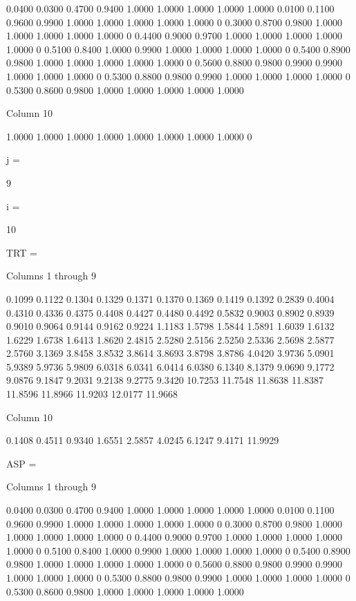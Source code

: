     0.0400    0.0300    0.4700    0.9400    1.0000    1.0000    1.0000    1.0000    1.0000
    0.0100    0.1100    0.9600    0.9900    1.0000    1.0000    1.0000    1.0000    1.0000
         0    0.3000    0.8700    0.9800    1.0000    1.0000    1.0000    1.0000    1.0000
         0    0.4400    0.9000    0.9700    1.0000    1.0000    1.0000    1.0000    1.0000
         0    0.5100    0.8400    1.0000    0.9900    1.0000    1.0000    1.0000    1.0000
         0    0.5400    0.8900    0.9800    1.0000    1.0000    1.0000    1.0000    1.0000
         0    0.5600    0.8800    0.9800    0.9900    0.9900    1.0000    1.0000    1.0000
         0    0.5300    0.8800    0.9800    0.9900    1.0000    1.0000    1.0000    1.0000
         0    0.5300    0.8600    0.9800    1.0000    1.0000    1.0000    1.0000    1.0000

  Column 10

    1.0000
    1.0000
    1.0000
    1.0000
    1.0000
    1.0000
    1.0000
    1.0000
         0


j =

     9


i =

    10


TRT =

  Columns 1 through 9

    0.1099    0.1122    0.1304    0.1329    0.1371    0.1370    0.1369    0.1419    0.1392
    0.2839    0.4004    0.4310    0.4336    0.4375    0.4408    0.4427    0.4480    0.4492
    0.5832    0.9003    0.8902    0.8939    0.9010    0.9064    0.9144    0.9162    0.9224
    1.1183    1.5798    1.5844    1.5891    1.6039    1.6132    1.6229    1.6738    1.6413
    1.8620    2.4815    2.5280    2.5156    2.5250    2.5336    2.5698    2.5877    2.5760
    3.1369    3.8458    3.8532    3.8614    3.8693    3.8798    3.8786    4.0420    3.9736
    5.0901    5.9389    5.9736    5.9809    6.0318    6.0341    6.0414    6.0380    6.1340
    8.1379    9.0690    9.1772    9.0876    9.1847    9.2031    9.2138    9.2775    9.3420
   10.7253   11.7548   11.8638   11.8387   11.8596   11.8966   11.9203   12.0177   11.9668

  Column 10

    0.1408
    0.4511
    0.9340
    1.6551
    2.5857
    4.0245
    6.1247
    9.4171
   11.9929


ASP =

  Columns 1 through 9

    0.0400    0.0300    0.4700    0.9400    1.0000    1.0000    1.0000    1.0000    1.0000
    0.0100    0.1100    0.9600    0.9900    1.0000    1.0000    1.0000    1.0000    1.0000
         0    0.3000    0.8700    0.9800    1.0000    1.0000    1.0000    1.0000    1.0000
         0    0.4400    0.9000    0.9700    1.0000    1.0000    1.0000    1.0000    1.0000
         0    0.5100    0.8400    1.0000    0.9900    1.0000    1.0000    1.0000    1.0000
         0    0.5400    0.8900    0.9800    1.0000    1.0000    1.0000    1.0000    1.0000
         0    0.5600    0.8800    0.9800    0.9900    0.9900    1.0000    1.0000    1.0000
         0    0.5300    0.8800    0.9800    0.9900    1.0000    1.0000    1.0000    1.0000
         0    0.5300    0.8600    0.9800    1.0000    1.0000    1.0000    1.0000    1.0000

